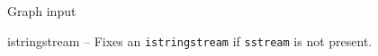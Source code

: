 \categorycontents{}

\begin{algorithm}{Graph input}
\end{algorithm}

\begin{algorithm}{istringstream}
-- Fixes an {\tt istringstream} if {\tt sstream} is not present.
\end{algorithm}

\begin{sourceslandscape}
\end{sourceslandscape}
